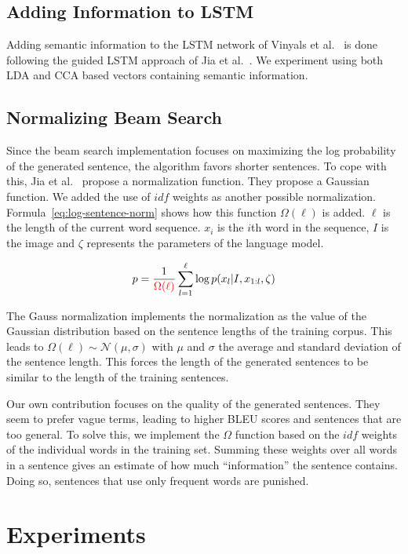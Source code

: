 \documentclass[twoside,twocolumn]{article}
\begin{document}
\subsection{Adding Information to LSTM}
Adding semantic information to the LSTM network of Vinyals et al.~\cite{Google} is done following the guided LSTM approach of Jia et al.~\cite{Fernando2015}. We experiment using both LDA and CCA based vectors containing semantic information.

\subsection{Normalizing Beam Search}
Since the beam search implementation focuses on maximizing the log probability of the generated sentence, the algorithm favors shorter sentences. To cope with this, Jia et al.~\cite{Fernando2015} propose a normalization function. They propose a Gaussian function. We added the use of $idf$ weights as another possible normalization. Formula~\eqref{eq:log-sentence-norm} shows how this function $\Omega(\ell)$ is added. $\ell$ is the length of the current word sequence. $x_i$ is the $i$th word in the sequence, $I$ is the image and $\zeta$ represents the parameters of the language model. 

\begin{equation}
p = \frac{1}{\color{red}{\Omega(\ell)}}\sum_{l=1}^{\ell} \log p(x_l | I, x_{1:l}, \zeta)
\label{eq:log-sentence-norm}
\end{equation}

The Gauss normalization implements the normalization as the value of the Gaussian distribution based on the sentence lengths of the training corpus. This leads to $\Omega(\ell) \sim \mathcal{N}(\mu, \sigma)$ with $\mu$ and $\sigma$ the average and standard deviation of the sentence length. This forces the length of the generated sentences to be similar to the length of the training sentences.

Our own contribution focuses on the quality of the generated sentences. They seem to prefer vague terms, leading to higher BLEU scores and sentences that are too general. To solve this, we implement the $\Omega$ function based on the $idf$ weights of the individual words in the training set. Summing these weights over all words in a sentence gives an estimate of how much ``information'' the sentence contains. Doing so, sentences that use only frequent words are punished.


\section{Experiments}
\label{sec:exp}
\end{document}
